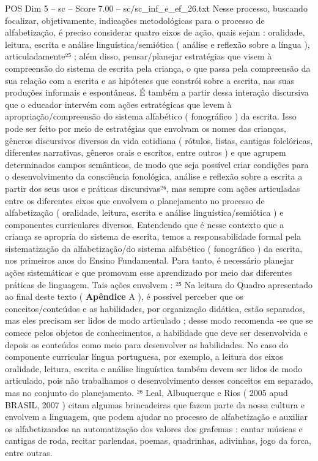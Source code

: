 \begin{textsample}{POS Dim 5 – sc – Score 7.00 – sc/sc\_inf\_e\_ef\_26.txt}
Nesse processo, buscando focalizar, objetivamente, indicações metodológicas para o processo de alfabetização, é preciso considerar quatro eixos de ação, quais sejam : oralidade, leitura, escrita e análise linguística/semiótica ( análise e reflexão sobre a língua ), articuladamente²⁵ ; além disso, pensar/planejar estratégias que visem à compreensão do sistema de escrita pela criança, o que passa pela compreensão da sua relação com a escrita e as hipóteses que constrói sobre a escrita, nas suas produções informais e espontâneas.
É também a partir dessa interação discursiva que o educador intervém com ações estratégicas que levem à apropriação/compreensão do sistema alfabético ( fonográfico ) da escrita.
Isso pode ser feito por meio de estratégias que envolvam os nomes das crianças, gêneros discursivos diversos da vida cotidiana ( rótulos, listas, cantigas folclóricas, diferentes narrativas, gêneros orais e escritos, entre outros ) e que agrupem determinados campos semânticos, de modo que seja possível criar condições para o desenvolvimento da consciência fonológica, análise e reflexão sobre a escrita a partir dos seus usos e práticas discursivas²⁶, mas sempre com ações articuladas entre os diferentes eixos que envolvem o planejamento no processo de alfabetização ( oralidade, leitura, escrita e análise linguística/semiótica ) e componentes curriculares diversos.
Entendendo que é nesse contexto que a criança se apropria do sistema de escrita, temos a responsabilidade formal pela sistematização da alfabetização/do sistema alfabético ( fonográfico ) da escrita, nos primeiros anos do Ensino Fundamental.
Para tanto, é necessário planejar ações sistemáticas e que promovam esse aprendizado por meio das diferentes práticas de linguagem.
Tais ações envolvem : ²⁵ Na leitura do Quadro apresentado ao final deste texto ( \textbf{Apêndice} A ), é possível perceber que os conceitos/conteúdos e as habilidades, por organização didática, estão separados, mas eles precisam ser lidos de modo articulado ; desse modo recomenda -se que se comece pelos objetos de conhecimentos, a habilidade que deve ser desenvolvida e depois os conteúdos como meio para desenvolver as habilidades.
No caso do componente curricular língua portuguesa, por exemplo, a leitura dos eixos oralidade, leitura, escrita e análise linguística também devem ser lidos de modo articulado, pois não trabalhamos o desenvolvimento desses conceitos em separado, mas no conjunto do planejamento. ²⁶ Leal, Albuquerque e Rios ( 2005 apud BRASIL, 2007 ) citam algumas brincadeiras que fazem parte da nossa cultura e envolvem a linguagem, que podem ajudar no processo de alfabetização e auxiliar os alfabetizandos na automatização dos valores dos grafemas : cantar músicas e cantigas de roda, recitar parlendas, poemas, quadrinhas, adivinhas, jogo da forca, entre outras.

\end{textsample}
